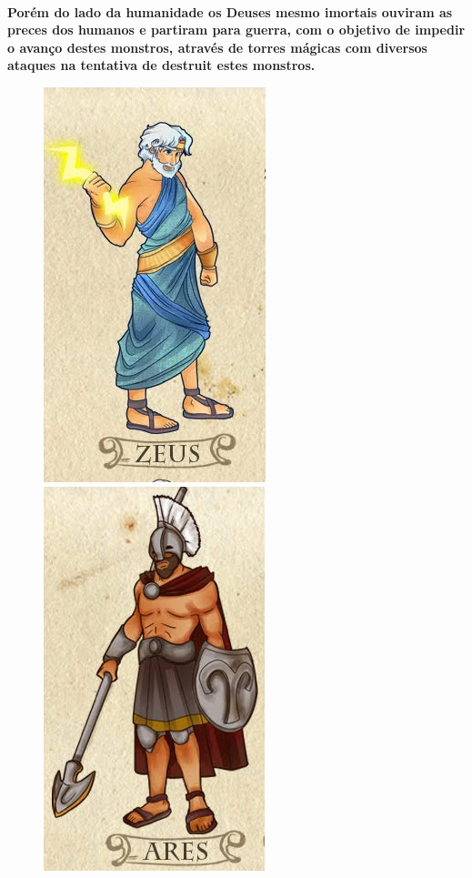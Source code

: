 \documentclass[11pt]{article} %
\begin{document}
\paragraph{}\textbf{Porém do lado da humanidade os Deuses mesmo imortais ouviram as preces dos humanos e partiram para guerra, com o objetivo de impedir o avanço destes monstros, através de torres mágicas com diversos ataques na tentativa de destruit estes monstros.}

\usepackage[opções]{subfigure}

\begin{figure}[!htp]
\centering
\includegraphics[scale=0.3]{res/zeus.png} \quad
\includegraphics[scale=0.3]{res/ares.png} \quad

\end{figure}
\end{document}
